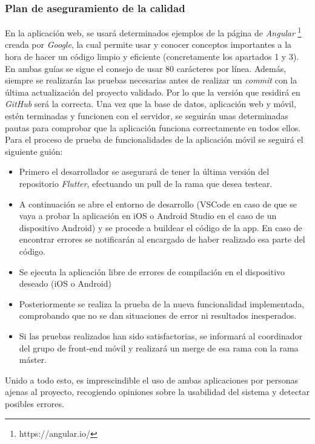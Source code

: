 \documentclass{article}
\begin{document}
\subsubsection{Plan de aseguramiento de la calidad}
En la aplicación web, se usará determinados ejemplos de la página de \textit{Angular} \footnote{https://angular.io/} creada por \textit{Google}, la cual permite usar y conocer conceptos importantes a la hora de hacer un código limpio y eficiente (concretamente los apartados 1 y 3).\\
En ambas guías se sigue el consejo de usar 80 carácteres por línea.
\hfill \break
Además, siempre se realizarán las pruebas necesarias antes de realizar un \textit{commit} con la última actualización del proyecto validado. Por lo que la versión que residirá en \textit{GitHub} será la correcta. 
\hfill \break
Una vez que la base de datos, aplicación web y móvil, estén terminadas y funcionen con el servidor, se seguirán unas determinadas pautas para comprobar que la aplicación funciona correctamente en todos ellos.  
Para el proceso de prueba de funcionalidades de la aplicación móvil se seguirá el siguiente guión:
\begin{itemize}
	\item Primero el desarrollador se asegurará de tener la última versión del repositorio \textit{Flutter}, efectuando un pull de la rama que desea testear.
	
	\item A continuación se abre el entorno de desarrollo (VSCode en caso de que se vaya a probar la aplicación en iOS o Android Studio en el caso de un dispositivo Android) y se procede a buildear el código de la app. En caso de encontrar errores se notificarán al encargado de haber realizado esa parte del código.
	
	\item Se ejecuta la aplicación libre de errores de compilación en el dispositivo deseado (iOS o Android)
	
	\item Posteriormente se realiza la prueba de la nueva funcionalidad implementada, comprobando que no se dan situaciones de error ni resultados inesperados.
	
	\item Si las pruebas realizados han sido satisfactorias, se informará al coordinador del grupo de front-end móvil y realizará un merge de esa rama con la rama máster.
\end{itemize}
Unido a todo esto, es imprescindible el uso de ambas aplicaciones por personas ajenas al proyecto, recogiendo opiniones sobre la usabilidad del sistema y detectar posibles errores. 
\newpage
\end{document}
